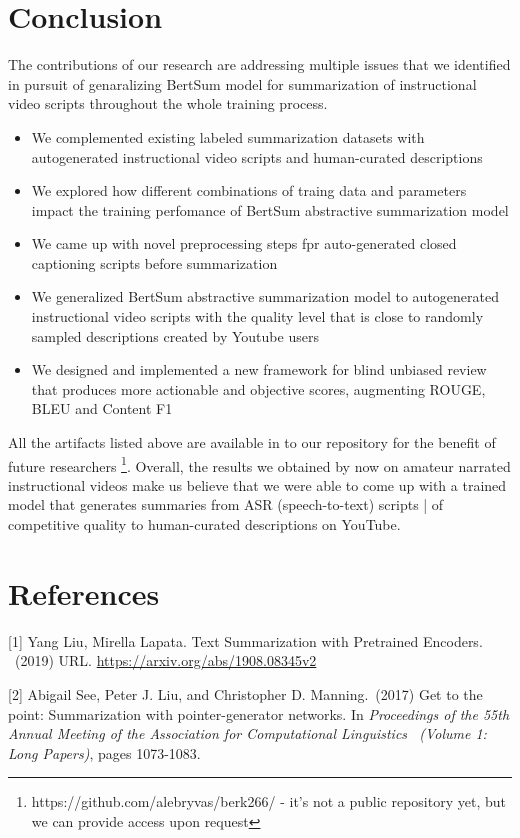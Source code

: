 \documentclass{article}
\begin{document}
\section{Conclusion}

The contributions of our research are addressing multiple issues that we identified in pursuit of genaralizing BertSum model for summarization of instructional video scripts throughout the whole training process. 

\begin{itemize}

\item We complemented existing labeled summarization datasets with autogenerated instructional video scripts and human-curated descriptions 
\item We explored how different combinations of traing data and parameters  impact the training perfomance  of BertSum abstractive summarization model
\item We came up with novel preprocessing steps fpr auto-generated closed captioning scripts before summarization
\item We generalized BertSum abstractive summarization model to autogenerated instructional video scripts with the quality level that is close to randomly sampled descriptions created by Youtube users
\item We designed and implemented a new framework for blind unbiased review that produces more actionable and objective scores,  augmenting ROUGE, BLEU and Content F1
\end{itemize}
 
All the artifacts listed above are available  in to our repository for the benefit of future researchers \footnote{https://github.com/alebryvas/berk266/ - it's not a public repository yet, but we can provide access upon request}. Overall, the results we obtained by now on amateur narrated instructional videos  make us believe that we were able to come up with a trained model  that generates summaries from ASR (speech-to-text) scripts | of competitive quality to human-curated descriptions on YouTube. 

\section*{References} 

[1] Yang Liu, Mirella Lapata. Text Summarization with Pretrained Encoders.  \ (2019) URL. \url{https://arxiv.org/abs/1908.08345v2}

[2] Abigail See, Peter J. Liu, and Christopher D. Manning.\ (2017) Get to the point: Summarization with pointer-generator networks. In {\it Proceedings of the 55th Annual Meeting of the Association for Computational Linguistics \ (Volume 1: Long Papers)}, pages 1073-1083.
\end{document}
